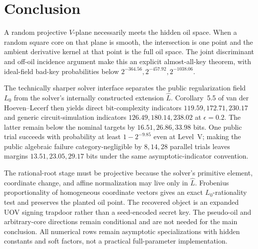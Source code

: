 \documentclass[10pt,a4paper]{article}
\begin{document}
\section{Conclusion}\label{sec:conclusion}

A random projective $V$-plane necessarily meets the hidden oil space.  When a random square core on that plane is smooth, the intersection is one point and the ambient derivative kernel at that point is the full oil space.  The joint discriminant and off-oil incidence argument make this an explicit almost-all-key theorem, with ideal-field bad-key probabilities below $2^{-364.56},2^{-457.92},2^{-1038.06}$.

The technically sharper solver interface separates the public regularization field $L_0$ from the solver's internally constructed extension $\widehat L$.  Corollary~5.5 of van der Hoeven--Lecerf then yields direct bit-complexity indicators $119.59,172.71,230.17$ and generic circuit-simulation indicators $126.49,180.14,238.02$ at $\epsilon=0.2$.  The latter remain below the nominal targets by $16.51,26.86,33.98$ bits.  One public trial succeeds with probability at least $1-2^{-9.85}$ even at Level~V; making the public algebraic failure category-negligible by $8,14,28$ parallel trials leaves margins $13.51,23.05,29.17$ bits under the same asymptotic-indicator convention.

The rational-root stage must be projective because the solver's primitive element, coordinate change, and affine normalization may live only in $\widehat L$.  Frobenius proportionality of homogeneous coordinate vectors gives an exact $L_0$-rationality test and preserves the planted oil point.  The recovered object is an expanded UOV signing trapdoor rather than a seed-encoded secret key.  The pseudo-oil and arbitrary-core directions remain conditional and are not needed for the main conclusion.  All numerical rows remain asymptotic specializations with hidden constants and soft factors, not a practical full-parameter implementation.
\end{document}
